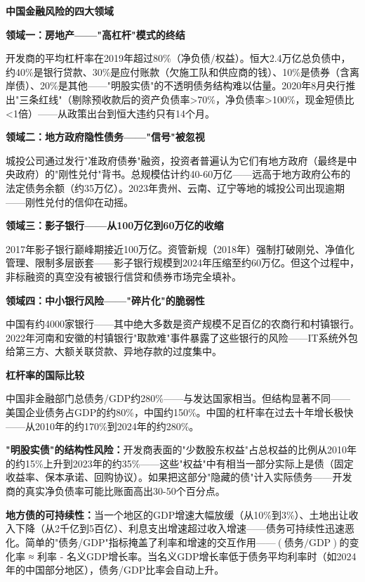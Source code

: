 \documentclass[a4paper,11pt]{ctexbook}
\begin{document}
\begin{qualitative}
\textbf{中国金融风险的四大领域}

\textbf{领域一：房地产——"高杠杆"模式的终结}

开发商的平均杠杆率在2019年超过80\%（净负债/权益）。恒大2.4万亿总负债中，约40\%是银行贷款、30\%是应付账款（欠施工队和供应商的钱）、10\%是债券（含离岸债）、20\%是其他——"明股实债"的不透明债务结构难以估量。2020年8月央行推出"三条红线"（剔除预收款后的资产负债率>70\%，净负债率>100\%，现金短债比<1倍）——从政策出台到恒大违约只有14个月。

\textbf{领域二：地方政府隐性债务——"信号"被忽视}

城投公司通过发行"准政府债券"融资，投资者普遍认为它们有地方政府（最终是中央政府）的"刚性兑付"背书。总规模估计约40-60万亿——远高于地方政府公布的法定债务余额（约35万亿）。2023年贵州、云南、辽宁等地的城投公司出现逾期——刚性兑付的信仰在动摇。

\textbf{领域三：影子银行——从100万亿到60万亿的收缩}

2017年影子银行巅峰期接近100万亿。资管新规（2018年）强制打破刚兑、净值化管理、限制多层嵌套——影子银行规模到2024年压缩至约60万亿。但这个过程中，非标融资的真空没有被银行信贷和债券市场完全填补。

\textbf{领域四：中小银行风险——"碎片化"的脆弱性}

中国有约4000家银行——其中绝大多数是资产规模不足百亿的农商行和村镇银行。2022年河南和安徽的村镇银行"取款难"事件暴露了这些银行的风险——IT系统外包给第三方、大额关联贷款、异地存款的过度集中。
\end{qualitative}

\begin{quantitative}
\textbf{杠杆率的国际比较}

中国非金融部门总债务/GDP约280\%——与发达国家相当。但结构显著不同——美国企业债务占GDP的约80\%，中国约150\%。中国的杠杆率在过去十年增长极快——从2010年的约170\%到2024年的约280\%。

\textbf{"明股实债"的结构性风险：}开发商表面的"少数股东权益"占总权益的比例从2010年的约15\%上升到2023年的约35\%——这些"权益"中有相当一部分实际上是债（固定收益率、保本承诺、回购协议）。如果把这部分"隐藏的债"计入实际债务——开发商的真实净负债率可能比账面高出30-50个百分点。

\textbf{地方债的可持续性：}当一个地区的GDP增速大幅放缓（从10\%到3\%）、土地出让收入下降（从2千亿到5百亿）、利息支出增速超过收入增速——债务可持续性迅速恶化。简单的"债务/GDP"指标掩盖了利率和增速的交互作用——$(\text{债务}/\text{GDP})$的变化率 ≈ 利率 - 名义GDP增长率。当名义GDP增长率低于债务平均利率时（如2024年的中国部分地区），债务/GDP比率会自动上升。
\end{quantitative}
\end{document}
